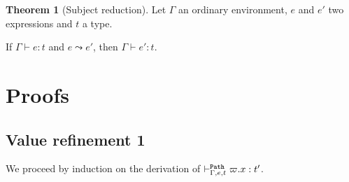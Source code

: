 \documentclass[a4paper]{article}
\theoremstyle{definition}
\newtheorem{theorem}{Theorem}
\begin{document}
        \begin{theorem}[Subject reduction]
          Let $\Gamma$ an ordinary environment, $e$ and $e'$ two expressions and $t$ a type.

          If $\Gamma\vdash e:t$ and $e\leadsto e'$, then $\Gamma\vdash e':t$.
        \end{theorem}

        \section{Proofs}

        \subsection{Value refinement 1}

        We proceed by induction on the derivation of $\vdash^{\texttt{Path}}_{\Gamma,e,t} \varpi.x:t'$.
\end{document}
